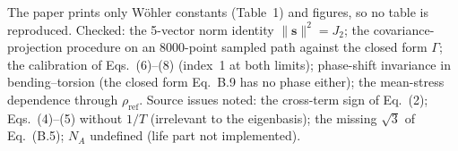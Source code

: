  The paper prints only W\"ohler constants (Table~1) and figures, so no table is
reproduced. Checked: the 5-vector norm identity $\lVert\mathbf s\rVert^2=J_2$; the covariance-projection
procedure on an 8000-point sampled path against the closed form $\Gamma$; the calibration of
Eqs.~(6)--(8) (index~1 at both limits); phase-shift invariance in bending--torsion (the closed form
Eq.~B.9 has no phase either); the mean-stress dependence through $\rho_{\mathrm{ref}}$. Source issues
noted: the cross-term sign of Eq.~(2); Eqs.~(4)--(5) without $1/T$ (irrelevant to the eigenbasis); the
missing $\sqrt3$ of Eq.~(B.5); $N_A$ undefined (life part not implemented).

